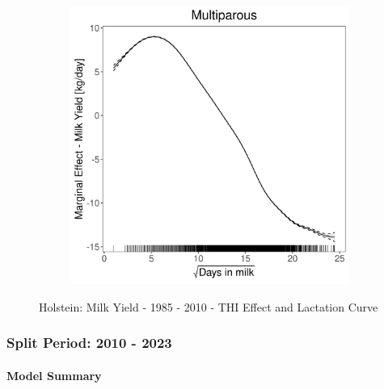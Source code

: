 \begin{figure}[H]
\begin{subfigure}[b]{0.45\textwidth}
    \end{subfigure}
    \hspace{0.05\textwidth} %
    \begin{subfigure}[b]{0.45\textwidth}
        \centering
        \includegraphics[width=\textwidth]{thesis/figures/models/milk/before2010/ho_milk_before2010/ho_milk_before2010_marginal_dim_milk_multi.png}
    \end{subfigure}
    \caption[]{Holstein: Milk Yield - 1985 - 2010 - THI Effect and Lactation Curve}
    \label{fig:main}
\end{figure}

\subsubsection{Split Period: 2010 - 2023}\label{model:ho_milk_after}

\paragraph{Model Summary} \quad \\

